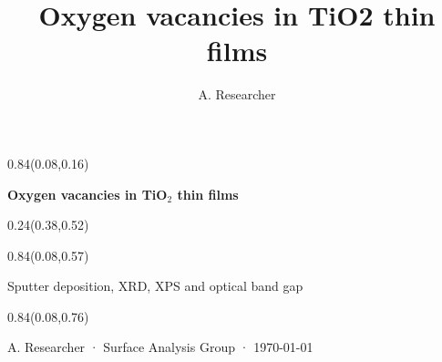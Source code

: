 \documentclass[aspectratio=169]{beamer}
\title{Oxygen vacancies in TiO2 thin films}
\author{A. Researcher}
\begin{document}
\begin{frame}[t]

\begin{textblock}{0.84}(0.08,0.16)
{\centering\fontsize{32}{38}\selectfont \textcolor[HTML]{1A1A1A}{\textbf{Oxygen vacancies in TiO$_2$ thin films}}\par}
\end{textblock}

\begin{textblock}{0.24}(0.38,0.52)
\end{textblock}

\begin{textblock}{0.84}(0.08,0.57)
{\centering\fontsize{17}{20}\selectfont \textcolor[HTML]{555555}{Sputter deposition, XRD, XPS and optical band gap}\par}
\end{textblock}

\begin{textblock}{0.84}(0.08,0.76)
{\centering\fontsize{13}{16}\selectfont \textcolor[HTML]{555555}{A. Researcher  ·  Surface Analysis Group  ·  \today}\par}
\end{textblock}
\end{frame}
\end{document}
